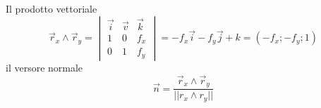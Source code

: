 \documentclass{book}
\begin{document}
Il prodotto vettoriale 
\begin{equation*}
	\vec{r}_x\wedge \vec{r}_y=\begin{vmatrix}
		\vec{i} & \vec{v} &\vec{k}\\
		1 & 0 & f_x\\
		0 & 1 &f_y
	\end{vmatrix}=-f_x\vec{i}-f_y\vec{j}+k=(-f_x;-f_y;1)
\end{equation*}
il versore normale
\begin{equation*}
	\vec{n}=\frac{\vec{r}_x\wedge \vec{r}_y}{||r_x\wedge r_y||}
\end{equation*}

\printindex
\end{document}
